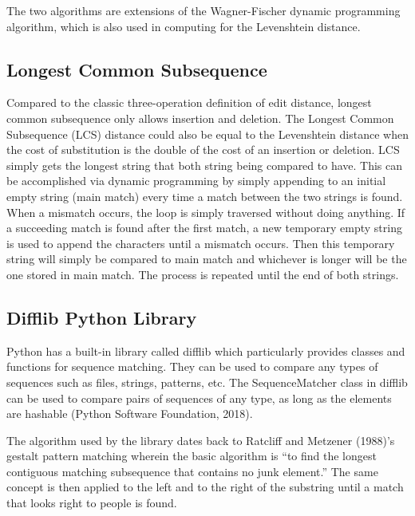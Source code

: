 The two algorithms are extensions of the Wagner-Fischer dynamic programming algorithm, which is also used in computing for the Levenshtein distance.

\subsection{Longest Common Subsequence}
Compared to the classic three-operation definition of edit distance, longest common subsequence only allows insertion and deletion. The Longest Common Subsequence (LCS) distance could also be equal to the Levenshtein distance when the cost of substitution is the double of the cost of an insertion or deletion. LCS simply gets the longest string that both string being compared to have. This can be accomplished via dynamic programming by simply appending to an initial empty string (main match) every time a match between the two strings is found. When a mismatch occurs, the loop is simply traversed without doing anything. If a succeeding match is found after the first match, a new temporary empty string is used to append the characters until a mismatch occurs. Then this temporary string will simply be compared to main match and whichever is longer will be the one stored in main match. The process is repeated until the end of both strings.

\subsection{Difflib Python Library}
Python has a built-in library called difflib which particularly provides classes and functions for sequence matching. They can be used to compare any types of sequences such as files, strings, patterns, etc. The SequenceMatcher class in difflib can be used to compare pairs of sequences of any type, as long as the elements are hashable (Python Software Foundation, 2018).

The algorithm used by the library dates back to Ratcliff and Metzener (1988)’s gestalt pattern matching wherein the basic algorithm is “to find the longest contiguous matching subsequence that contains no junk element.” The same concept is then applied to the left and to the right of the substring until a match that looks right to people is found.

\nocite{Dubnov}
\nocite{Azcarraga2016}
\nocite{cambouropoulosEmilios}
\nocite{3dsom}
\nocite{correa}
\nocite{imogen}
\nocite{libin}
\nocite{foote}
\nocite{silla}
\nocite{mcfee}
\nocite{hepokoski}
\nocite{heikkinen}
\nocite{bbc}
\nocite{huron}
\nocite{mckay}
\nocite{mcennis}
\nocite{loughran}
\nocite{lutter}
\nocite{mermelstein}
\nocite{agarwal}
\nocite{iitg}
\nocite{ng}
\nocite{mccria}
\nocite{brownlee}
\nocite{germano}
\nocite{bullinaria}
\nocite{kropotov}
\nocite{grabczewski}
\nocite{gupta}
\nocite{brownlee1}
\nocite{trevino}
\nocite{hartigan}
\nocite{brown}
\nocite{ziv}
\nocite{ron}
\nocite{mitchell}
\nocite{guyon}
\nocite{yang}
\nocite{kohonen}
\nocite{maaten}
\nocite{rumelhart}
\nocite{storkey}